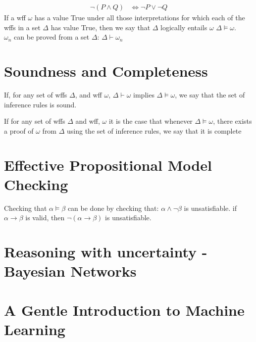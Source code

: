 \documentclass[a4paper]{article}
\begin{document}
\begin{align}
  \lnot (P \land Q) &\Leftrightarrow \lnot P \lor \lnot Q
\end{align}
If a wff $\omega$ has a value True under all those interpretations for which
each of the wffs in a set $\Delta$ has value True, then we say that $\Delta$
logically entails $\omega$ $\Delta \models \omega$.\\
$\omega_n$ can be proved from a set $\Delta$: $\Delta \vdash \omega_n$
\section{Soundness and Completeness}
\begin{framed}
  If, for any set of wffs $\Delta$, and wff $\omega$, $\Delta \vdash \omega$
  implies $\Delta \models \omega$, we say that the set of inference rules is
  sound.
\end{framed}

\begin{framed}
  If for any set of wffs $\Delta$ and wff, $\omega$ it is the case that whenever
  $\Delta \models \omega$, there exists a proof of $\omega$ from $\Delta$ using
  the set of inference rules, we say that it is complete
\end{framed}

\section{Effective Propositional Model Checking}
Checking that $\alpha \models \beta$ can be done by checking that: $\alpha \land
\lnot \beta$ is unsatisfiable. if $\alpha \rightarrow \beta$ is valid, then
$\lnot (\alpha \rightarrow \beta)$ is unsatisfiable. 

\section{Reasoning with uncertainty - Bayesian Networks}

\section{A Gentle Introduction to Machine Learning}
\end{document}
